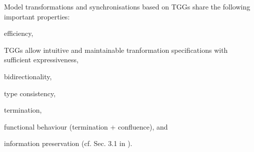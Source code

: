 Model transformations and synchronisations based on TGGs share the following important properties:
\begin{enumerate*}
\item efficiency,
\item TGGs allow intuitive and maintainable tranformation specifications with sufficient expressiveness,
\item bidirectionality,
\item type consistency,
\item termination,
\item functional behaviour (termination + confluence), and
\item information preservation (cf. Sec. 3.1 in \cite{FAGT2}).
\end{enumerate*}
